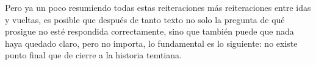 \documentclass[
  spanish,
]{book}
\begin{document}
Pero ya un poco resumiendo todas estas reiteraciones más reiteraciones entre idas y vueltas, es posible que después de tanto texto no solo la pregunta de qué prosigue no esté respondida correctamente, sino que también puede que nada haya quedado claro, pero no importa, lo fundamental es lo siguiente: no existe punto final que de cierre a la historia temtiana.
\end{document}
